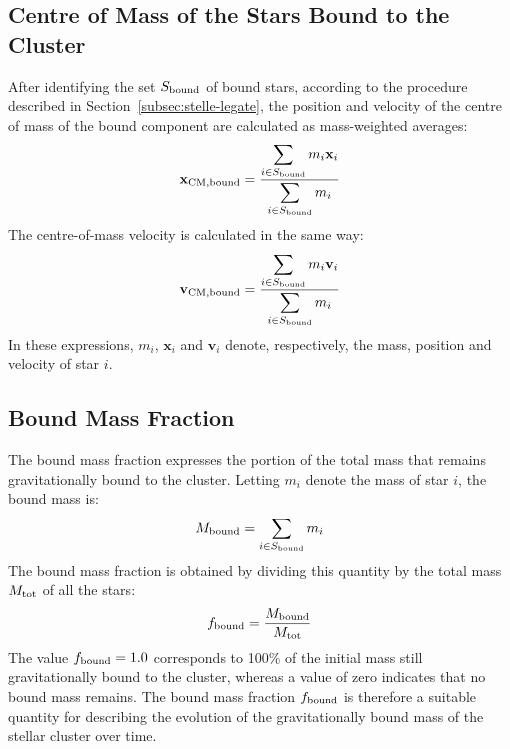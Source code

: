 \subsection{Centre of Mass of the Stars Bound to the Cluster}
\label{subsec:centro-massa-legato}
After identifying the set $S_{\mathrm{bound}}$ of bound stars, according to the procedure described in Section~\ref{subsec:stelle-legate}, the position and velocity of the centre of mass of the bound component are calculated as mass-weighted averages:
\begin{equation}
	\mathbf{x}_{\mathrm{CM,bound}} =
	\frac{\displaystyle\sum_{i\in S_{\mathrm{bound}}}m_i\mathbf{x}_i}
	{\displaystyle\sum_{i\in S_{\mathrm{bound}}}m_i}
	\label{eq:com-bound-position}
\end{equation}
The centre-of-mass velocity is calculated in the same way:
\begin{equation}
	\mathbf{v}_{\mathrm{CM,bound}} =
	\frac{\displaystyle\sum_{i\in S_{\mathrm{bound}}}m_i\mathbf{v}_i}
	{\displaystyle\sum_{i\in S_{\mathrm{bound}}}m_i}
	\label{eq:com-bound-velocity}
\end{equation}
In these expressions, $m_i$, $\mathbf{x}_i$ and $\mathbf{v}_i$ denote, respectively, the mass, position and velocity of star $i$.
\subsection{Bound Mass Fraction}
\label{subsec:frazione-massa-legata}
The bound mass fraction expresses the portion of the total mass that remains gravitationally bound to the cluster. Letting $m_i$ denote the mass of star $i$, the bound mass is:
\begin{equation}
	M_{\mathrm{bound}} = \sum_{i\in S_{\mathrm{bound}}}m_i
	\label{eq:bound-mass}
\end{equation}
The bound mass fraction is obtained by dividing this quantity by the total mass $M_{\mathrm{tot}}$ of all the stars:
\begin{equation}
	f_{\mathrm{bound}} =
	\frac{M_{\mathrm{bound}}}{M_{\mathrm{tot}}}
	\label{eq:bound-mass-fraction}
\end{equation}
The value $f_{\mathrm{bound}}=1.0$ corresponds to 100\% of the initial mass still gravitationally bound to the cluster, whereas a value of zero indicates that no bound mass remains.
The bound mass fraction $f_{\mathrm{bound}}$ is therefore a suitable quantity for describing the evolution of the gravitationally bound mass of the stellar cluster over time.
